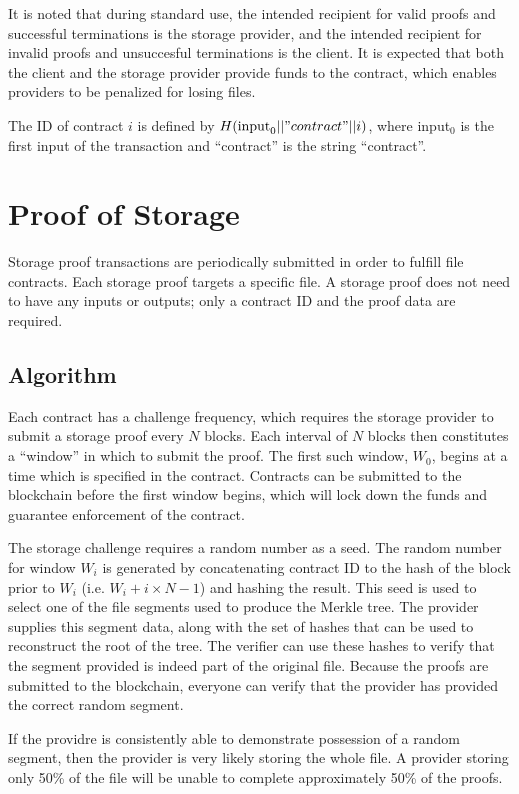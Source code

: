 \documentclass[twocolumn]{article}
\begin{document}
It is noted that during standard use, the intended recipient for valid proofs and successful terminations is the storage provider, and the intended recipient for invalid proofs and unsuccesful terminations is the client.
It is expected that both the client and the storage provider provide funds to the contract, which enables providers to be penalized for losing files.

The ID of contract $i$ is defined by $H(\text{input}_0 || "contract" || i)$, where input$_0$ is the first input of the transaction and ``contract'' is the string ``contract''.

\section{Proof of Storage}
\label{sec:storage}
Storage proof transactions are periodically submitted in order to fulfill file contracts.
Each storage proof targets a specific file.
A storage proof does not need to have any inputs or outputs; only a contract ID and the proof data are required.

\subsection{Algorithm}
Each contract has a challenge frequency, which requires the storage provider to submit a storage proof every $N$ blocks.
Each interval of $N$ blocks then constitutes a ``window'' in which to submit the proof.
The first such window, $W_0$, begins at a time which is specified in the contract.
Contracts can be submitted to the blockchain before the first window begins, which will lock down the funds and guarantee enforcement of the contract.

The storage challenge requires a random number as a seed.
The random number for window $W_i$ is generated by concatenating contract ID to the hash of the block prior to $W_i$ (i.e. $W_i + i \times N - 1$) and hashing the result.
This seed is used to select one of the file segments used to produce the Merkle tree.
The provider supplies this segment data, along with the set of hashes that can be used to reconstruct the root of the tree.
The verifier can use these hashes to verify that the segment provided is indeed part of the original file.
Because the proofs are submitted to the blockchain, everyone can verify that the provider has provided the correct random segment.

If the providre is consistently able to demonstrate possession of a random segment, then the provider is very likely storing the whole file.
A provider storing only 50\% of the file will be unable to complete approximately 50\% of the proofs.
\end{document}
